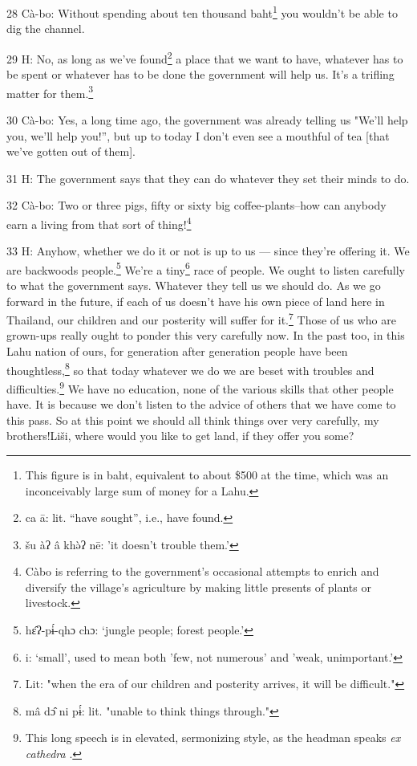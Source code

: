 28 Cà-bo: Without spending about ten thousand baht\footnote{This figure is in baht, equivalent to about \$500 at the time, which was an inconceivably large sum of money for a Lahu.} you wouldn't be able to
dig the channel.

29 H: No, as long as we've found\footnote{ca ā: lit. ``have sought'', i.e., have found.} a place that we want to have, whatever has
to be spent or whatever has to be done the government will help us. It's a trifling
matter for them.\footnote{šu àʔ â khə̀ʔ nē: 'it doesn't trouble them.'}

30 Cà-bo: Yes, a long time ago, the government was already telling us "We'll
help you, we'll help you!'', but up to today I don't even see a mouthful of tea
[that we've gotten out of them].

31 H: The government says that they can do whatever they set their minds to do.

32 Cà-bo: Two or three pigs, fifty or sixty big coffee-plants--how can anybody
earn a living from that sort of thing!\footnote{Càbo is referring to the government's occasional attempts to enrich and diversify the village's agriculture by making little presents of plants or livestock.}

33 H: Anyhow, whether we do it or not is up to us --- since they're offering it.
We are backwoods people.\footnote{hɛ̂ʔ-pɨ́-qhɔ chɔ: `jungle people; forest people.'} We're a tiny\footnote{i: `small', used to mean both 'few, not numerous' and 'weak, unimportant.'} race of people. We ought to listen
carefully to what the government says. Whatever they tell us we should do. As we
go forward in the future, if each of us doesn't have his own piece of land here
in Thailand, our children and our posterity will suffer for it.\footnote{Lit: "when the era of our children and posterity arrives, it will be difficult."} Those of us
who are grown-ups really ought to ponder this very carefully now. In the past too,
in this Lahu nation of ours, for generation after generation people have been thoughtless,\footnote{mâ dɔ̂ ni pɨ́: lit. "unable to think things through."}
so that today whatever we do we are beset with troubles and difficulties.\footnote{This long speech is in elevated, sermonizing style, as the headman speaks \textit{ex cathedra }.} We
have no education, none of the various skills that other people have. It is because
we don't listen to the advice of others that we have come to this pass. So at this
point we should all think things over very carefully, my brothers!Liši, where
would you like to get land, if they offer you some?

